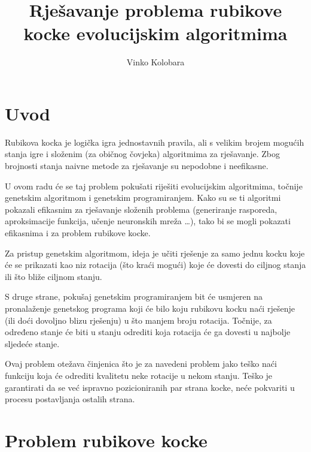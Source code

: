 \documentclass[times, utf8, seminar, numeric]{fer}
\begin{document}
\nocite{*}

\title{Rješavanje problema rubikove kocke evolucijskim algoritmima}

\author{Vinko Kolobara}


\maketitle

\tableofcontents

\chapter{Uvod}

Rubikova kocka je logička igra jednostavnih pravila, ali s velikim brojem mogućih stanja igre i složenim (za običnog čovjeka) algoritmima za rješavanje. Zbog brojnosti stanja naivne metode za rješavanje su nepodobne i neefikasne. 

U ovom radu će se taj problem pokušati riješiti evolucijskim algoritmima, točnije genetskim algoritmom i genetskim programiranjem. Kako su se ti algoritmi pokazali efikasnim za rješavanje složenih problema (generiranje rasporeda, aproksimacije funkcija, učenje neuronskih mreža \dots), tako bi se mogli pokazati efikasnima i za problem rubikove kocke. 

Za pristup genetskim algoritmom, ideja je učiti rješenje za samo jednu kocku koje će se prikazati kao niz rotacija (što kraći mogući) koje će dovesti do ciljnog stanja ili što bliže ciljnom stanju.

S druge strane, pokušaj genetskim programiranjem bit će usmjeren na pronalaženje genetskog programa koji će bilo koju rubikovu kocku naći rješenje (ili doći dovoljno blizu rješenju) u što manjem broju rotacija. Točnije, za određeno stanje će biti u stanju odrediti koja rotacija će ga dovesti u najbolje sljedeće stanje.

Ovaj problem otežava činjenica što je za navedeni problem jako teško naći funkciju koja će odrediti kvalitetu neke rotacije u nekom stanju. Teško je garantirati da se već ispravno pozicioniranih par strana kocke, neće pokvariti u procesu postavljanja ostalih strana.


\chapter{Problem rubikove kocke}
\end{document}
